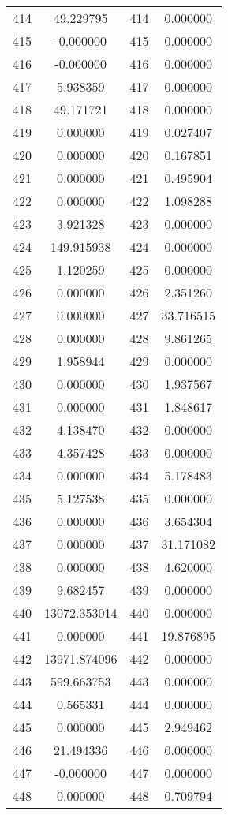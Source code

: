 \documentclass[12pt]{article}
\begin{document}
\begin{longtable}{@{}cccc@{}}
414 & 49.229795 & 414 & 0.000000 \\
415 & -0.000000 & 415 & 0.000000 \\
416 & -0.000000 & 416 & 0.000000 \\
417 & 5.938359 & 417 & 0.000000 \\
418 & 49.171721 & 418 & 0.000000 \\
419 & 0.000000 & 419 & 0.027407 \\
420 & 0.000000 & 420 & 0.167851 \\
421 & 0.000000 & 421 & 0.495904 \\
422 & 0.000000 & 422 & 1.098288 \\
423 & 3.921328 & 423 & 0.000000 \\
424 & 149.915938 & 424 & 0.000000 \\
425 & 1.120259 & 425 & 0.000000 \\
426 & 0.000000 & 426 & 2.351260 \\
427 & 0.000000 & 427 & 33.716515 \\
428 & 0.000000 & 428 & 9.861265 \\
429 & 1.958944 & 429 & 0.000000 \\
430 & 0.000000 & 430 & 1.937567 \\
431 & 0.000000 & 431 & 1.848617 \\
432 & 4.138470 & 432 & 0.000000 \\
433 & 4.357428 & 433 & 0.000000 \\
434 & 0.000000 & 434 & 5.178483 \\
435 & 5.127538 & 435 & 0.000000 \\
436 & 0.000000 & 436 & 3.654304 \\
437 & 0.000000 & 437 & 31.171082 \\
438 & 0.000000 & 438 & 4.620000 \\
439 & 9.682457 & 439 & 0.000000 \\
440 & 13072.353014 & 440 & 0.000000 \\
441 & 0.000000 & 441 & 19.876895 \\
442 & 13971.874096 & 442 & 0.000000 \\
443 & 599.663753 & 443 & 0.000000 \\
444 & 0.565331 & 444 & 0.000000 \\
445 & 0.000000 & 445 & 2.949462 \\
446 & 21.494336 & 446 & 0.000000 \\
447 & -0.000000 & 447 & 0.000000 \\
448 & 0.000000 & 448 & 0.709794 \\

\end{longtable}
\end{document}
